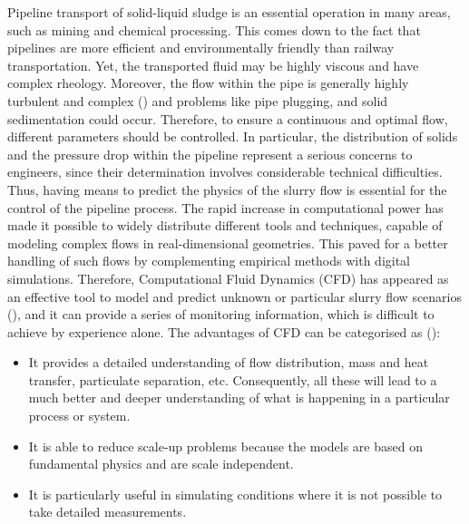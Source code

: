 \documentclass[review,3p,times,12pt]{elsarticle}
\begin{document}
Pipeline transport of solid-liquid sludge is an essential operation in many areas, such as mining and chemical processing. This comes down to the fact that pipelines are more efficient and environmentally friendly than railway transportation. Yet, the transported fluid may be highly viscous and have complex rheology. Moreover, the flow within the pipe is  generally highly turbulent and complex (\citet{Lahiri-2010}) and problems like pipe plugging, and solid sedimentation could occur. Therefore, to ensure a continuous and optimal flow, different parameters should be controlled. In particular, the distribution of solids and the pressure drop within the pipeline represent a serious concerns to engineers, since their determination involves considerable technical difficulties. Thus, having means to predict the physics of the slurry flow is essential for the control of the pipeline process. The rapid increase in computational power has made it possible to widely distribute different tools and techniques, capable of modeling complex flows in real-dimensional geometries. This paved for a better handling of such flows by complementing empirical methods with digital simulations. Therefore, Computational Fluid Dynamics (CFD) has appeared as an effective tool to model and predict unknown or particular slurry flow scenarios (\citet{Bi-2002}), and it can provide a series of monitoring information, which is difficult to achieve by experience alone.
The advantages of CFD can be categorised as (\citet{wanot-1996}):
\begin{itemize}
\item It provides a detailed understanding of flow distribution, mass and heat transfer, particulate separation, etc. Consequently, all these will lead to a much better and deeper understanding of what is happening in a particular process or system.
\item It is able to reduce scale-up problems because the models are based on fundamental physics and are scale independent.
\item It is particularly useful in simulating conditions where it is not possible to take detailed measurements.
\end{itemize}
\end{document}
